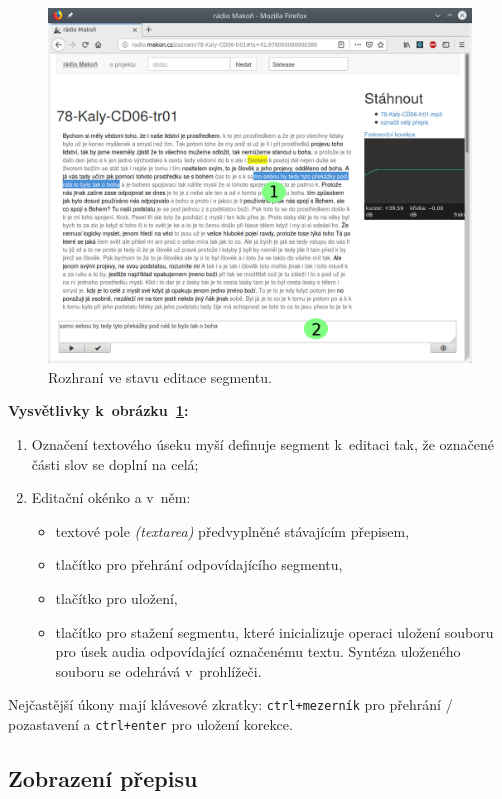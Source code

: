 \begin{figure}[htpb]
\includegraphics[scale=0.7]{rc/radio-makon-cs-2-lab.png}
\caption{Rozhraní ve stavu editace segmentu.}
\label{fig:scn2lab}
\end{figure}

\textbf{Vysvětlivky k~obrázku~\ref{fig:scn2lab}:}
\begin{enumerate}
\item{
    Označení textového úseku myší definuje segment k~editaci tak, že označené
    části slov se doplní na celá;
}
\item{
    Editační okénko a v~něm:
    \begin{itemize}
    \item{textové pole {\em (textarea)} předvyplněné stávajícím přepisem,}
    \item{tlačítko pro přehrání odpovídajícího segmentu,}
    \item{tlačítko pro uložení,}
    \item{
        tlačítko pro stažení segmentu, které inicializuje operaci uložení
        souboru pro úsek audia odpovídající označenému textu. Syntéza uloženého
        souboru se odehrává v~prohlížeči.
    }
    \end{itemize}
}
\end{enumerate}

Nejčastější úkony mají klávesové zkratky: \texttt{ctrl+mezerník} pro
přehrání / pozastavení a \texttt{ctrl+enter} pro uložení korekce.

\subsection{Zobrazení přepisu}

